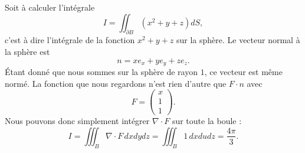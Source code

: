 \begin{example}
    Soit à calculer l'intégrale
    \begin{equation}
        I=\iint_{\partial B}(x^2+y+z)dS,
    \end{equation}
    c'est à dire l'intégrale de la fonction $x^2+y+z$ sur la sphère. Le vecteur normal à la sphère est
    \begin{equation}
        n=xe_x+ye_y+ze_z.
    \end{equation}
    Étant donné que nous sommes sur la sphère de rayon $1$, ce vecteur est même normé. La fonction que nous regardons n'est rien d'autre que $F\cdot n$ avec
    \begin{equation}
        F=\begin{pmatrix}
            x    \\ 
            1    \\ 
            1    
        \end{pmatrix}.
    \end{equation}
    Nous pouvons donc simplement intégrer $\nabla\cdot F$ sur toute la boule :
    \begin{equation}
        I=\iiint_{B}\nabla\cdot F\,dxdydz=\iiint_B 1\,dxdudz=\frac{ 4\pi }{ 3 }.
    \end{equation}
\end{example}
